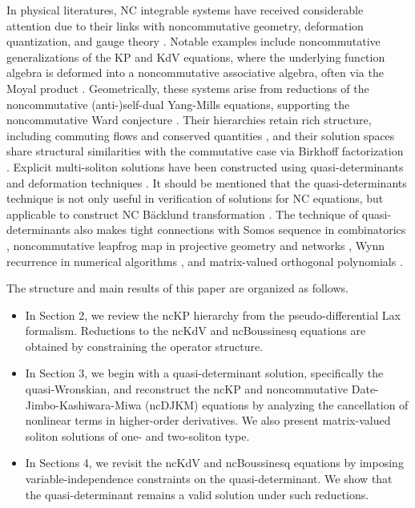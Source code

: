 \documentclass[11p,reqno]{amsart}
\numberwithin{equation}{section}
\numberwithin{equation}{section}
\begin{document}
In physical literatures, NC integrable systems have received considerable attention due to their links with noncommutative geometry, deformation quantization, and gauge theory \cite{szabo03,castellani00,asakawa00,landi03}. Notable examples include noncommutative generalizations of the KP and KdV equations, where the underlying function algebra is deformed into a noncommutative associative algebra, often via the Moyal product \cite{hamanaka10,paniak01}. Geometrically, these systems arise from reductions of the noncommutative (anti-)self-dual Yang-Mills equations, supporting the noncommutative Ward conjecture \cite{hamanaka03}. Their hierarchies retain rich structure, including commuting flows and conserved quantities \cite{hamanaka05}, and their solution spaces share structural similarities with the commutative case via Birkhoff factorization \cite{sakakibara04}. Explicit multi-soliton solutions have been constructed using quasi-determinants and deformation techniques \cite{hamanaka07}. It should be mentioned that the quasi-determinants technique is not only useful in verification of solutions for NC equations, but applicable to construct NC B\"acklund transformation \cite{gilson08}.  The technique of quasi-determinants also makes tight connections with Somos sequence in combinatorics \cite{bobrova24}, noncommutative leapfrog map in projective geometry and networks \cite{wang25}, 
Wynn recurrence in numerical algorithms \cite{doliwa23}, and matrix-valued orthogonal polynomials \cite{li24,gilson25}. 

The structure and main results of this paper are organized as follows.
\begin{itemize}
    \item In Section 2, we review the ncKP hierarchy from the pseudo-differential Lax formalism. Reductions to the ncKdV and ncBoussinesq equations are obtained by constraining the operator structure.

    \item In Section 3, we begin with a quasi-determinant solution, specifically the quasi-Wronskian, and reconstruct the ncKP and noncommutative Date-Jimbo-Kashiwara-Miwa (ncDJKM) equations by analyzing the cancellation of nonlinear terms in higher-order derivatives. We also present matrix-valued soliton solutions of one- and two-soliton type.

    \item In Sections 4, we revisit the ncKdV and ncBoussinesq equations by imposing variable-independence constraints on the quasi-determinant. We show that the quasi-determinant remains a valid solution under such reductions.
\end{itemize}
\end{document}
